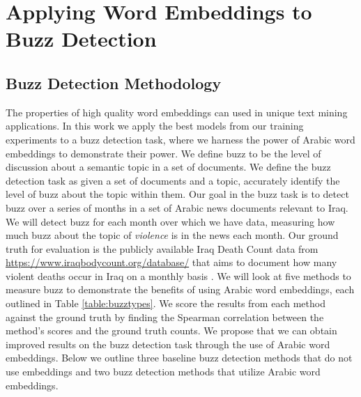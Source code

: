 \chapter{Applying Word Embeddings to Buzz Detection}
\label{sec:buzz}

\section{Buzz Detection Methodology}

The properties of high quality word embeddings can used in unique text mining applications. In this work we apply the best models from our training experiments to a buzz detection task, where we harness the power of Arabic word embeddings to demonstrate their power. We define buzz to be the level of discussion about a semantic topic in a set of documents. We define the buzz detection task as given a set of documents and a topic, accurately identify the level of buzz about the topic within them. Our goal in the buzz task is to detect buzz over a series of months in a set of Arabic news documents relevant to Iraq. We will detect buzz for each month over which we have data, measuring how much buzz about the topic of \textit{violence} is in the news each month. Our ground truth for evaluation is the publicly available Iraq Death Count data from \url{https://www.iraqbodycount.org/database/} that aims to document how many violent deaths occur in Iraq on a monthly basis \cite{IraqB68:online}. We will look at five methods to measure buzz to demonstrate the benefits of using Arabic word embeddings, each outlined in Table \ref{table:buzztypes}. We score the results from each method against the ground truth by finding the Spearman correlation between the method's scores and the ground truth counts. We propose that we can obtain improved results on the buzz detection task through the use of Arabic word embeddings. Below we outline three baseline buzz detection methods that do not use embeddings and two buzz detection methods that utilize Arabic word embeddings.
\\
